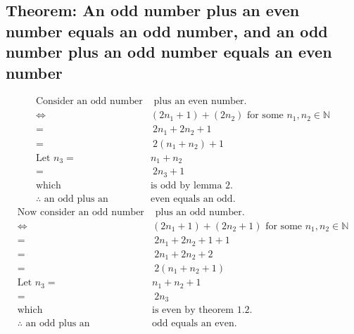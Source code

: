 \documentclass[11pt, oneside]{article}   	%
\begin{document}
	\subsection{Theorem: An odd number plus an even number equals an odd number, and an odd number plus an odd number equals an even number}
		\begin{align*}
			\text{Consider an odd number}&\text{ plus an even number.}\\
			\iff & (2n_1+1) + (2n_2) \text{ for some } n_1, n_2 \in \mathbb{N}\\
			= &\ 2n_1 + 2n_2 + 1\\
			= &\ 2(n_1 + n_2) + 1\\
			\text{Let } n_3 =& n_1 + n_2\\
			= &\ 2n_3 + 1\\
			\text{which }& \text{is odd by lemma 2}.\\
			\therefore \text{ an odd plus an }&\text{even equals an odd.}
		\end{align*}
		\begin{align*}
			\text{Now consider an odd number}&\text{ plus an odd number.}\\
			\iff & (2n_1+1) + (2n_2+1) \text{ for some } n_1, n_2 \in \mathbb{N}\\
			= &\ 2n_1 + 2n_2 + 1 + 1\\
			= &\ 2n_1 + 2n_2 + 2\\
			= &\ 2(n_1 + n_2 + 1)\\
			\text{Let } n_3 = & n_1 + n_2 + 1\\
			= &\ 2n_3\\
			\text{which }& \text{is even by theorem 1.2}.\\
			\therefore \text{ an odd plus an }&\text{odd equals an even.}
		\end{align*}
\end{document}

